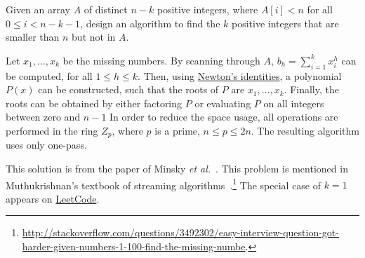 \begin{Exercise}
Given an array $A$ of distinct $n - k$ positive integers, where $A[i] < n$ for all $0 \leq i < n - k - 1$, design an algorithm to find the $k$ positive integers that are smaller than $n$ but not in $A$.
\end{Exercise}
\begin{Answer}
Let $x_1, \dots, x_k$ be the missing numbers. 
By scanning through $A$, $b_h = \sum_{i=1}^k x_i^h$ can be computed, for all $1 \leq h \leq k$. 
Then, using \href{https://en.wikipedia.org/wiki/Newton\%27s_identities}{Newton's identities}, a polynomial $P(x)$ can be constructed, such that the roots of $P$ are $x_1, \dots, x_k$. 
Finally, the roots can be obtained by either factoring $P$ or evaluating $P$ on all integers between zero and $n - 1$ 
In order to reduce the space usage, all operations are performed in the ring $Z_p$, where $p$ is a prime, $n \leq p \leq 2n$. The resulting algorithm uses only one-pass.
\begin{remark}
This solution is from the paper of Minsky \emph{et al.}~\cite{Minsky2003}. This problem is mentioned in Muthukrishnan's textbook of streaming algorithms~\cite{Muthukrishnan2005}.\footnote{\url{http://stackoverflow.com/questions/3492302/easy-interview-question-got-harder-given-numbers-1-100-find-the-missing-numbe}.} The special case of $k = 1$ appears on \href{https://leetcode.com/problems/missing-number/}{LeetCode}.
\end{remark}
\end{Answer}

